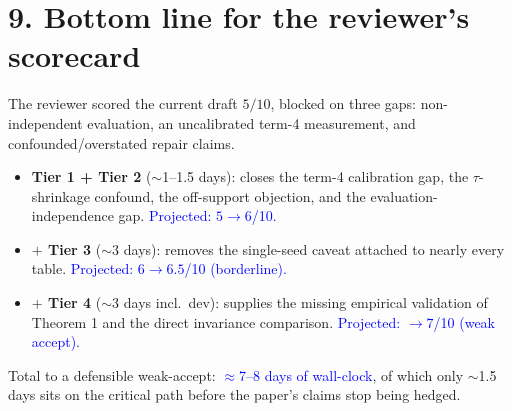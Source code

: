\documentclass[10pt,letterpaper]{article}
\newcommand{\pj}[1]{\textcolor{blue}{#1}}
\begin{document}
\section*{9. Bottom line for the reviewer's scorecard}

The reviewer scored the current draft $5/10$, blocked on three gaps:
non-independent evaluation, an uncalibrated term-4 measurement, and
confounded/overstated repair claims.

\begin{itemize}
  \item \textbf{Tier 1 + Tier 2} ($\sim$1--1.5 days): closes the term-4
        calibration gap, the $\tau$-shrinkage confound, the off-support
        objection, and the evaluation-independence gap. \pj{Projected: $5\to6$/10.}
  \item \textbf{$+$ Tier 3} ($\sim$3 days): removes the single-seed caveat
        attached to nearly every table. \pj{Projected: $6\to6.5$/10 (borderline).}
  \item \textbf{$+$ Tier 4} ($\sim$3 days incl.\ dev): supplies the missing
        empirical validation of Theorem 1 and the direct invariance
        comparison. \pj{Projected: $\to7$/10 (weak accept).}
\end{itemize}

\noindent
Total to a defensible weak-accept: \pj{$\approx$7--8 days of wall-clock},
of which only $\sim$1.5 days sits on the critical path before the paper's
claims stop being hedged.
\end{document}
